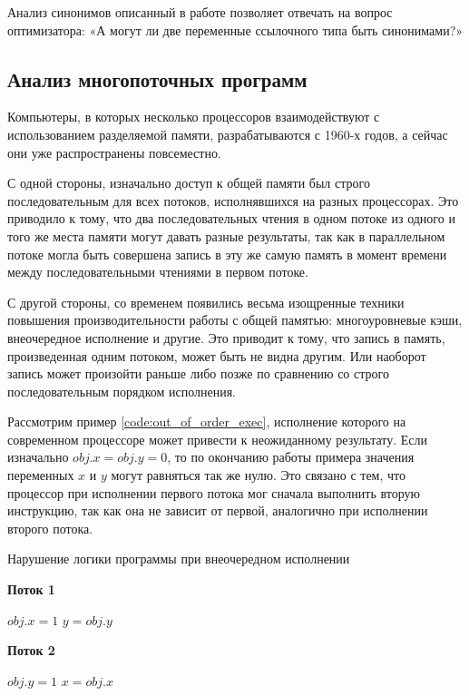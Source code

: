 \documentclass[14pt,titlepage]{extarticle}
\newcommand{\algorithmictitle}[1]{\hspace{8mm}\textbf{#1}}
\begin{document}
      Анализ синонимов описанный в работе позволяет отвечать на
      вопрос оптимизатора: «А могут ли две переменные ссылочного типа быть
      синонимами?»

    \subsection{Анализ многопоточных программ}
      \label{section:intro_to_multithreading}

      Компьютеры, в которых несколько процессоров взаимодействуют с
      использованием разделяемой памяти, разрабатываются с 1960-х годов, а
      сейчас они уже распространены повсеместно.

      С одной стороны, изначально доступ к общей памяти был строго
      последовательным для всех потоков, исполнявшихся на разных процессорах.
      Это приводило к тому, что два последовательных чтения в одном потоке из
      одного и того же места памяти могут давать разные результаты, так как в
      параллельном потоке могла быть совершена запись в эту же самую память в
      момент времени между последовательными чтениями в первом потоке.

      С другой стороны, со временем появились весьма изощренные техники
      повышения производительности работы с общей памятью: многоуровневые кэши,
      внеочередное исполнение и другие.
      Это приводит к тому, что запись в память, произведенная одним потоком,
      может быть не видна другим. Или наоборот запись может произойти раньше
      либо позже по сравнению со строго последовательным порядком исполнения.

      Рассмотрим пример \ref{code:out_of_order_exec}, исполнение которого на
      современном процессоре может привести к неожиданному результату.
      Если изначально $obj.x = obj.y = 0$, то по окончанию работы примера
      значения переменных $x$ и $y$ могут равняться так же нулю. Это связано с
      тем, что процессор при исполнении первого потока мог сначала выполнить
      вторую инструкцию, так как она не зависит от первой, аналогично при
      исполнении второго потока.

      \begin{algorithm}
        \caption{Нарушение логики программы при внеочередном исполнении}
        \label{code:out_of_order_exec}
        \begin{multicols*}{2}
          \algorithmictitle{Поток 1}
          \begin{algorithmic}[1]
            \STATE $obj.x = 1$
            \STATE $y = obj.y$
          \end{algorithmic}
          \columnbreak
          \algorithmictitle{Поток 2}
          \begin{algorithmic}[1]
            \STATE $obj.y = 1$
            \STATE $x = obj.x$
          \end{algorithmic}
        \end{multicols*}
      \end{algorithm}
\end{document}
